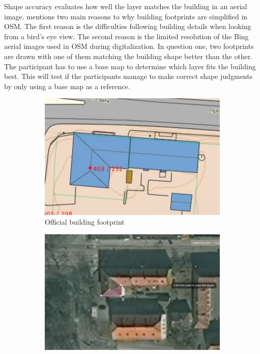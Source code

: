 Shape accuracy evaluates how well the layer matches the building in an aerial image. \cite{Fan2014} mentions two main reasons to why building footprints are simplified in OSM. The first reason is the difficulties following building details when looking from a bird's eye view. The second reason is the limited resolution of the Bing aerial images used in OSM during digitalization. In question one, two footprints are drawn with one of them matching the building shape better than the other. The participant has to use a base map to determine which layer fits the building best. This will test if the participants manage to make correct shape judgments by only using a base map as a reference. 

\begin{figure}[H]
	\centering
	\begin{subfigure}[b]{0.32\textwidth}
		\centering
		\includegraphics[width=\linewidth]{fig/build1}
		\caption{Official building footprint}
		\label{fig:build1}
	\end{subfigure}
	\begin{subfigure}[b]{0.32\textwidth}
		\centering
		\includegraphics[width=\linewidth]{fig/build2}

\end{subfigure}
\end{figure}
